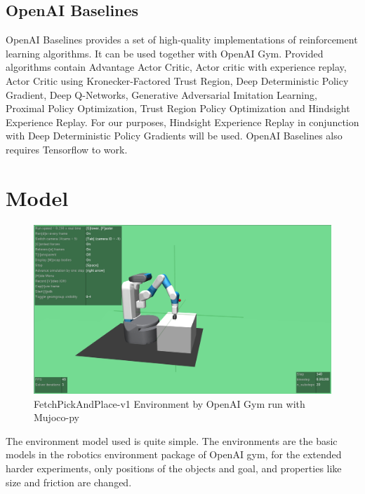 \subsection{OpenAI Baselines}

OpenAI Baselines provides a set of high-quality implementations of reinforcement learning algorithms. It can be used together with OpenAI Gym. Provided algorithms contain Advantage Actor Critic, Actor critic with experience replay, Actor Critic using Kronecker-Factored Trust Region,  Deep Deterministic Policy Gradient, Deep Q-Networks, Generative Adversarial Imitation Learning, Proximal Policy Optimization, Trust Region Policy Optimization and Hindsight Experience Replay.
For our purposes, Hindsight Experience Replay in conjunction with Deep Deterministic Policy Gradients will be used. 
OpenAI Baselines also requires Tensorflow to work.

\section{Model}

\begin{figure}
	
	\centering
	\includegraphics[width=1\textwidth]{figures/PickAndPlace.jpg}
	\caption{FetchPickAndPlace-v1 Environment by OpenAI Gym run with Mujoco-py
	}
\end{figure}

The environment model used is quite simple. The environments are the basic models in the robotics environment package of OpenAI gym, for the extended harder experiments, only positions of the objects and goal, and properties like size and friction are changed. 

